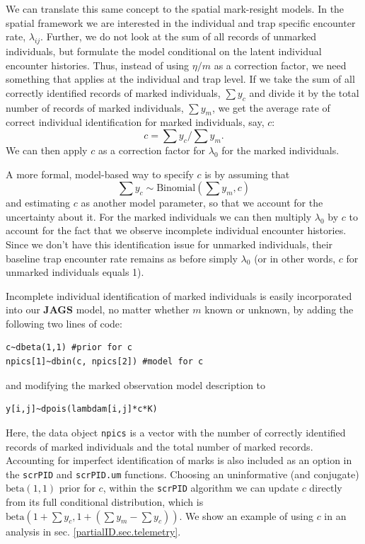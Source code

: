 We can
translate this same concept to the spatial
mark-resight models. In the spatial framework we are interested
in the individual and trap specific encounter rate,
$\lambda_{ij}$. Further, we do not look at the sum of all records of
unmarked individuals, but formulate the model conditional on the
latent individual encounter histories. Thus, instead of using $\eta/m$
as a correction factor, we need something that applies at the
individual and trap level. If we take the sum of all correctly
identified records of marked individuals, $\sum y_c$ and divide it by
the total number of records of marked individuals, $\sum y_m$, we get
the average rate of correct individual identification for marked
individuals, say, $c$:
\[
c = \sum y_c/\sum y_m.
\]
We can then apply $c$ as a correction factor for $\lambda_0$ for the marked individuals.

A more formal, model-based way to specify $c$ is by assuming that
\[
\sum y_c \sim \mbox{Binomial}(\sum y_m, c)
\]
and estimating $c$ as another model parameter, so that we account for the uncertainty about it.
For the marked individuals we can then multiply $\lambda_0$
by $c$ to account for the fact that we observe incomplete individual
encounter histories. Since we don't have this identification issue for
unmarked individuals, their baseline trap encounter rate remains as
before simply $\lambda_0$ (or in other words, $c$ for unmarked individuals equals 1).

Incomplete individual identification of marked
individuals is easily incorporated into our {\bf JAGS} model, no matter whether $m$ known or unknown, by adding the following two lines of code:
{\small
\begin{verbatim}
c~dbeta(1,1) #prior for c
npics[1]~dbin(c, npics[2]) #model for c
\end{verbatim}
}
and modifying the marked observation model description to
{\small
\begin{verbatim}
y[i,j]~dpois(lambdam[i,j]*c*K)
\end{verbatim}
}
Here, the data object {\tt npics} is a vector with the number of correctly identified records of marked individuals and the total number of marked records. Accounting for imperfect identification of marks is also included as an option in the {\tt scrPID} and  {\tt scrPID.um} functions. Choosing an uninformative (and conjugate) $\mbox{beta}(1,1)$ prior for $c$, within the {\tt scrPID} algorithm we can update $c$ directly from its full conditional distribution, which is $\mbox{beta}(1 + \sum y_c, 1 + (\sum y_m-\sum y_c))$.
We show an example of using $c$ in an analysis in
sec. \ref{partialID.sec.telemetry}.

